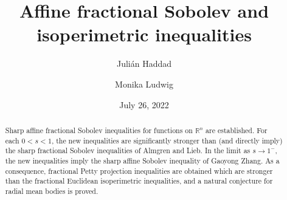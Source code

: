 \documentclass{amsart}
\begin{document}
\title[Affine fractional Sobolev inequalities]{Affine fractional Sobolev and isoperimetric inequalities} %

\author[J. Haddad ]{Juli\'an Haddad}
\address{Departamento de An\'{a}lisis Matem\'{a}tico\\ Facultad de Matem\'{a}ticas\\ Universidad de Sevilla\\ Sevilla, Spain\\}
\author[M. Ludwig]{Monika Ludwig}
\address{Institut f\"ur Diskrete Mathematik und Geometrie\\
Technische Universit\"at Wien\\
Wiedner Hauptstra\ss e 8-10/1046\\
1040 Wien, Austria\\}
\makeatother
%

\begin{abstract}
Sharp affine fractional Sobolev inequalities for functions on
$\mathbb R^{n}$ are established. For each $0<s<1$, the new inequalities
are significantly stronger than (and directly imply) the sharp fractional
Sobolev inequalities of Almgren and Lieb. In the limit as
$s\to 1^{-}$, the new inequalities imply the sharp affine Sobolev inequality
of Gaoyong Zhang. As a consequence, fractional Petty projection inequalities
are obtained which are stronger than the fractional Euclidean isoperimetric
inequalities, and a natural conjecture for radial mean bodies is proved.

\end{abstract}


\date{July 26, 2022} %
\end{document}
